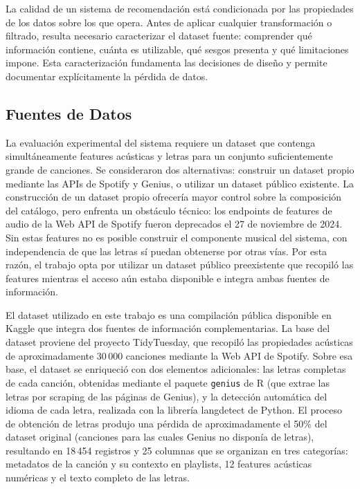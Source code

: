 La calidad de un sistema de recomendación está condicionada por las propiedades de los datos sobre los que opera. Antes de aplicar cualquier transformación o filtrado, resulta necesario caracterizar el dataset fuente: comprender qué información contiene, cuánta es utilizable, qué sesgos presenta y qué limitaciones impone. Esta caracterización fundamenta las decisiones de diseño y permite documentar explícitamente la pérdida de datos.

\subsection{Fuentes de Datos}
\label{subsec:fuentes}

La evaluación experimental del sistema requiere un dataset que contenga simultáneamente features acústicas y letras para un conjunto suficientemente grande de canciones. Se consideraron dos alternativas: construir un dataset propio mediante las APIs de Spotify y Genius, o utilizar un dataset público existente. La construcción de un dataset propio ofrecería mayor control sobre la composición del catálogo, pero enfrenta un obstáculo técnico: los endpoints de features de audio de la Web API de Spotify fueron deprecados el 27 de noviembre de 2024. Sin estas features no es posible construir el componente musical del sistema, con independencia de que las letras sí puedan obtenerse por otras vías. Por esta razón, el trabajo opta por utilizar un dataset público preexistente que recopiló las features mientras el acceso aún estaba disponible e integra ambas fuentes de información.

El dataset utilizado en este trabajo es una compilación pública disponible en Kaggle que integra dos fuentes de información complementarias. La base del dataset proviene del proyecto TidyTuesday, que recopiló las propiedades acústicas de aproximadamente 30\,000 canciones mediante la Web API de Spotify. Sobre esa base, el dataset se enriqueció con dos elementos adicionales: las letras completas de cada canción, obtenidas mediante el paquete \texttt{genius} de R (que extrae las letras por scraping de las páginas de Genius), y la detección automática del idioma de cada letra, realizada con la librería langdetect de Python. El proceso de obtención de letras produjo una pérdida de aproximadamente el 50\% del dataset original (canciones para las cuales Genius no disponía de letras), resultando en 18\,454 registros y 25 columnas que se organizan en tres categorías: metadatos de la canción y su contexto en playlists, 12 features acústicas numéricas y el texto completo de las letras.

